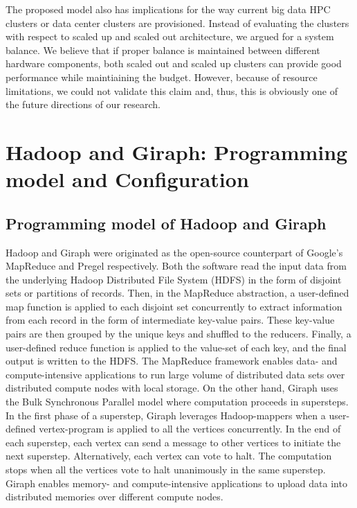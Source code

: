 \documentclass[journal]{IEEEtran}
\begin{document}
The proposed model also has implications for the way current big data HPC clusters or data center clusters are provisioned. Instead of evaluating the clusters with respect to scaled up and scaled out architecture, we argued for a system balance. We believe that if proper balance is maintained between different hardware components, both scaled out and scaled up clusters can provide good performance while maintiaining the budget.  However, because of resource limitations, we could not validate this claim and, thus, this is obviously one of the future directions of our research.

\appendices
\section{Hadoop and Giraph: Programming model and Configuration}
 \label{app:HadoopConfigurationsAndoptimizations}
\subsection{Programming model of Hadoop and Giraph}
Hadoop and Giraph were originated as the open-source counterpart of Google's MapReduce \cite{fw:mapreduce} and Pregel \cite{fw:pregel} respectively. Both the software read the input data from the underlying Hadoop Distributed File System (HDFS) in the form of disjoint sets or partitions of records. Then, in the MapReduce abstraction, a user-defined map function is applied to each disjoint set concurrently to extract information from each record in the form of intermediate key-value pairs. These key-value pairs are then grouped by the unique keys and shuffled to the reducers. Finally, a user-defined reduce function is applied to the value-set of each key, and the final output is written to the HDFS. The MapReduce framework enables data- and compute-intensive applications to run large volume of distributed data sets over distributed compute nodes with local storage. On the other hand, Giraph uses the Bulk Synchronous Parallel model \cite{fw:bsp} where computation proceeds in supersteps. In the first phase of a superstep, Giraph leverages Hadoop-mappers when a user-defined vertex-program is applied to all the vertices concurrently. In the end of each superstep, each vertex can send a message to other vertices to initiate the next superstep. Alternatively, each vertex can vote to halt. The computation stops when all the vertices vote to halt unanimously in the same superstep. Giraph enables memory- and compute-intensive applications to upload data into distributed memories over different compute nodes.
 
\end{document}
